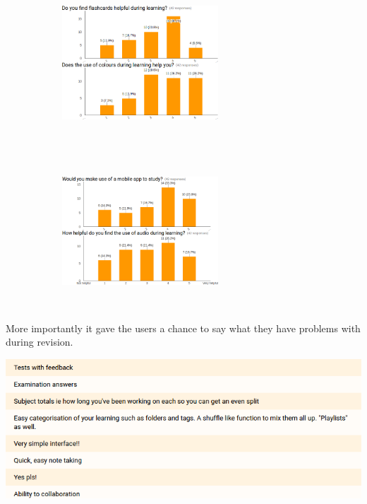 \documentclass{article}
\begin{document}
\begin{figure}[ht]
	\centering
	\begin{subfigure}{}
	  \centering
			\includegraphics[width=5.85cm, height=5.8cm]{images_colours.png}
	\end{subfigure}%
	\begin{subfigure}{}
	  \centering
			\includegraphics[width=5.85cm, height=5.8cm]{mobile_audio.png}
	\end{subfigure}
\end{figure}

\newpage
More importantly it gave the users a chance to say what they have problems with during revision.

\begin{center}
	\vspace{1mm}
	\includegraphics[scale=0.5]{feedback.png}
	\vspace{1mm}
\end{center}
\end{document}
